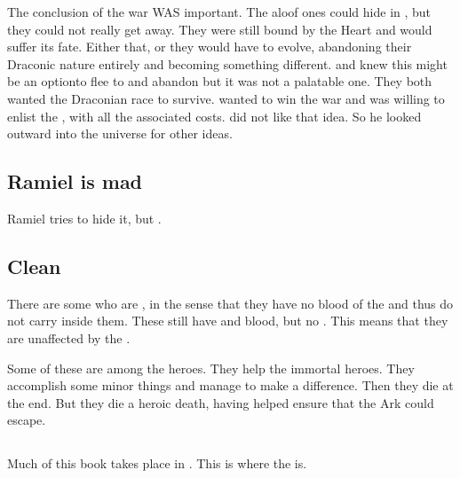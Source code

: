 The conclusion of the war WAS important.
The aloof ones could hide in \Machai, but they could not really get away. 
They were still bound by the Heart and would suffer its fate.
Either that, or they would have to evolve, abandoning their Draconic nature entirely and becoming something different.
\Ishnaruchaefir and \Secherdamon knew this might be an option\dash{}to flee to \Machai and abandon \dragonkind\dash{}but it was not a palatable one. 
They both wanted the Draconian race to survive.
\Secherdamon wanted to win the war and was willing to enlist the \xs, with all the associated costs.
\Ishnaruchaefir did not like that idea.
So he looked outward into the universe for other ideas.









\subsection{Ramiel is mad}
Ramiel tries to hide it, but . 









\subsection{Clean \humans}
There are some \humans who are , in the sense that they have no blood of the  and thus do not carry \Lithrim inside them. 
These \humans still have \bane and \resphan blood, but no \Lithrim.
This means that they are unaffected by the . 

Some of these \humans are among the heroes. 
They help the immortal heroes.
They accomplish some minor things and manage to make a difference. 
Then they die at the end.
But they die a heroic death, having helped ensure that the Ark could escape. 









\subsection{\Neevrai}
Much of this book takes place in . 
This is where the  is. 

















